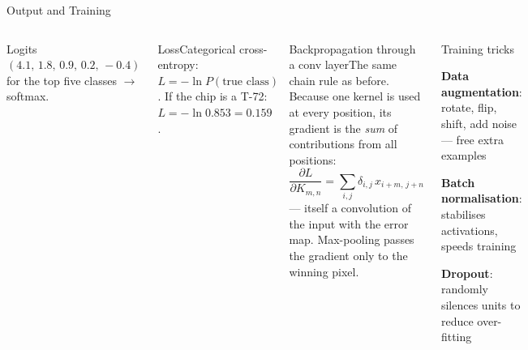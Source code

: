 \documentclass[aspectratio=169,10pt]{beamer}
\begin{document}
\begin{frame}{Output and Training}
\begin{columns}[T]
\scriptsize Logits $(4.1,\,1.8,\,0.9,\,0.2,\,-0.4)$ for the top five classes $\to$ softmax.
\begin{cbox}{Loss}\scriptsize Categorical cross-entropy: $L=-\ln P(\text{true class})$. If the chip is a T-72: $L=-\ln0.853=0.159$.\end{cbox}
\begin{cbox}[ISSAnavy]{Backpropagation through a conv layer}\scriptsize The same chain rule as before. Because one kernel is used at every position, its gradient is the \emph{sum} of contributions from all positions:
\[\frac{\partial L}{\partial K_{m,n}}=\sum_{i,j}\delta_{i,j}\,x_{i+m,\,j+n}\]
--- itself a convolution of the input with the error map. Max-pooling passes the gradient only to the winning pixel.\end{cbox}
\begin{cbox}{Training tricks}
\begin{tl}
\item \textbf{Data augmentation}: rotate, flip, shift, add noise --- free extra examples
\item \textbf{Batch normalisation}: stabilises activations, speeds training
\item \textbf{Dropout}: randomly silences units to reduce over-fitting
\end{tl}
\end{cbox}
\end{columns}
\end{frame}
\end{document}
